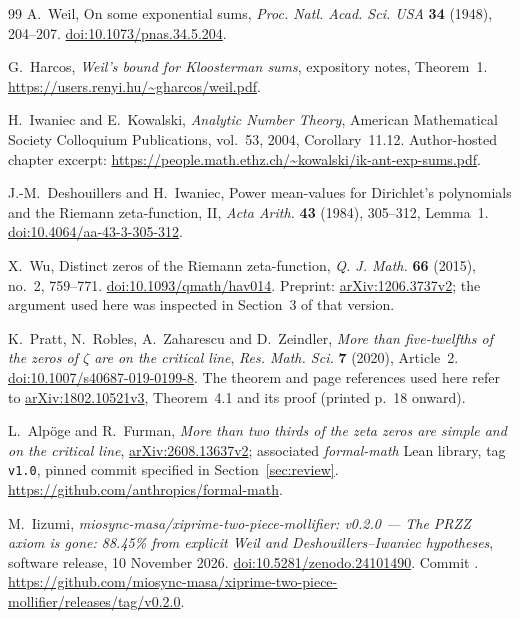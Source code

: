 \documentclass[11pt]{article}
\theoremstyle{definition}
\begin{document}
\clearpage
\begin{thebibliography}{99}
\setlength{\itemsep}{2pt}
A.~Weil, On some exponential sums,
\emph{Proc. Natl. Acad. Sci. USA} \textbf{34} (1948), 204--207.
\href{https://doi.org/10.1073/pnas.34.5.204}{doi:10.1073/pnas.34.5.204}.

G.~Harcos, \emph{Weil's bound for Kloosterman sums}, expository notes,
Theorem~1.
\url{https://users.renyi.hu/~gharcos/weil.pdf}.

H.~Iwaniec and E.~Kowalski, \emph{Analytic Number Theory},
American Mathematical Society Colloquium Publications, vol.~53, 2004,
Corollary~11.12. Author-hosted chapter excerpt:
\url{https://people.math.ethz.ch/~kowalski/ik-ant-exp-sums.pdf}.

J.-M.~Deshouillers and H.~Iwaniec,
Power mean-values for Dirichlet's polynomials and the Riemann
zeta-function, II,
\emph{Acta Arith.} \textbf{43} (1984), 305--312, Lemma~1.
\href{https://doi.org/10.4064/aa-43-3-305-312}{doi:10.4064/aa-43-3-305-312}.

X.~Wu, Distinct zeros of the Riemann zeta-function,
\emph{Q. J. Math.} \textbf{66} (2015), no.~2, 759--771.
\href{https://doi.org/10.1093/qmath/hav014}{doi:10.1093/qmath/hav014}.
Preprint: \href{https://arxiv.org/abs/1206.3737v2}{arXiv:1206.3737v2};
the argument used here was inspected in Section~3 of that version.

K.~Pratt, N.~Robles, A.~Zaharescu and D.~Zeindler,
\emph{More than five-twelfths of the zeros of \(\zeta\) are on the
critical line},
\emph{Res. Math. Sci.} \textbf{7} (2020), Article~2.
\href{https://doi.org/10.1007/s40687-019-0199-8}{doi:10.1007/s40687-019-0199-8}.
The theorem and page references used here refer to
\href{https://arxiv.org/abs/1802.10521v3}{arXiv:1802.10521v3},
Theorem~4.1 and its proof (printed p.~18 onward).

L.~Alp\"oge and R.~Furman,
\emph{More than two thirds of the zeta zeros are simple and on the critical line},
\href{https://arxiv.org/abs/2608.13637v2}{arXiv:2608.13637v2};
associated \emph{formal-math} Lean library, tag \texttt{v1.0},
pinned commit specified in Section~\ref{sec:review}.
\url{https://github.com/anthropics/formal-math}.

M.~Iizumi,
\emph{miosync-masa/xiprime-two-piece-mollifier:
v0.2.0 --- The PRZZ axiom is gone: 88.45\% from explicit Weil and
Deshouillers--Iwaniec hypotheses}, software release, 10 November 2026.
\href{https://doi.org/10.5281/zenodo.24101490}{doi:10.5281/zenodo.24101490}.
Commit .
\url{https://github.com/miosync-masa/xiprime-two-piece-mollifier/releases/tag/v0.2.0}.


\end{thebibliography}
\end{document}
